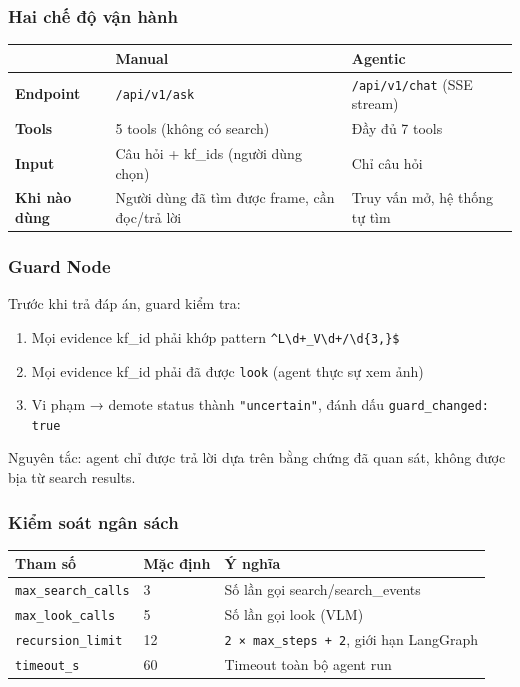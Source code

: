 \documentclass[12pt,a4paper,onecolumn]{article}
\begin{document}
\subsubsection{Hai chế độ vận hành}

\noindent
\begin{tabularx}{\textwidth}{l Y Y}
\toprule
 & \textbf{Manual} & \textbf{Agentic} \\
\midrule
\textbf{Endpoint} & \texttt{/api/v1/ask} & \texttt{/api/v1/chat} (SSE stream) \\
\textbf{Tools} & 5 tools (không có search) & Đầy đủ 7 tools \\
\textbf{Input} & Câu hỏi + kf\_ids (người dùng chọn) & Chỉ câu hỏi \\
\textbf{Khi nào dùng} & Người dùng đã tìm được frame, cần đọc/trả lời & Truy vấn mở, hệ thống tự tìm \\
\bottomrule
\end{tabularx}


\subsubsection{Guard Node}

Trước khi trả đáp án, guard kiểm tra:

\begin{enumerate}
  \item Mọi evidence kf\_id phải khớp pattern \texttt{\textasciicircum{}L\textbackslash{}d+\_V\textbackslash{}d+/\textbackslash{}d\{3,\}\$}
  \item Mọi evidence kf\_id phải đã được \texttt{look} (agent thực sự xem ảnh)
  \item Vi phạm → demote status thành \texttt{"uncertain"}, đánh dấu \texttt{guard\_changed: true}
\end{enumerate}


Nguyên tắc: agent chỉ được trả lời dựa trên bằng chứng đã quan sát, không được bịa từ search results.

\subsubsection{Kiểm soát ngân sách}

\begin{center}
\begin{tabular}{l l l}
\toprule
Tham số & Mặc định & Ý nghĩa \\
\midrule
\texttt{max\_search\_calls} & 3 & Số lần gọi search/search\_events \\
\texttt{max\_look\_calls} & 5 & Số lần gọi look (VLM) \\
\texttt{recursion\_limit} & 12 & \texttt{2 × max\_steps + 2}, giới hạn LangGraph \\
\texttt{timeout\_s} & 60 & Timeout toàn bộ agent run \\
\bottomrule
\end{tabular}
\end{center}
\end{document}
